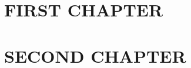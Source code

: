 \chapter{\uppercase{First Chapter} \label{chapter:01}}



\chapter{\uppercase{Second Chapter} \label{chapter:01}}

